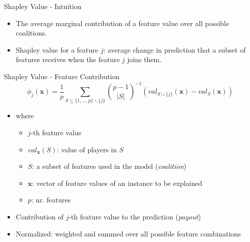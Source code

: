 \begin{frame}{Shapley Value - Intuition}
	\begin{itemize}\setlength\itemsep{4em}
		\item<1-> The average marginal contribution of a feature value over all possible coalitions.
		\item<2-> Shapley value for a feature $j$: average change in prediction that a subset of features receives when the feature $j$ joins them.
	\end{itemize}
\end{frame}
\begin{frame}{Shapley Value - Feature Contribution}
\begin{equation}
	\phi_j(\bm{x})=\frac{1}{p}\sum_{S\subseteq\{1,\ldots,p\} \backslash \{j\}}\binom{p-1}{|S|}^{-1}\left(val_{S\cup\{j\}}(\bm{x})-val_S(\bm{x})\right)
\end{equation}
\begin{itemize}\setlength\itemsep{2em}
	\item[]
	where
	\begin{itemize}
		\item $j$-th feature value
		\item $val_{\bm{x}}(S)$: value of players in $S$ %
		\item $S$: a subset of features used in the model (\emph{coalition})
		\item $\bm{x}$: vector of feature values of an instance to be explained
		\item $p$: nr. features
	\end{itemize}
	\item<1-> Contribution of $j$-th feature value to the prediction (\emph{payout})
	\item<2-> Normalized: weighted and summed over all possible feature combinations
\end{itemize}
\end{frame}



